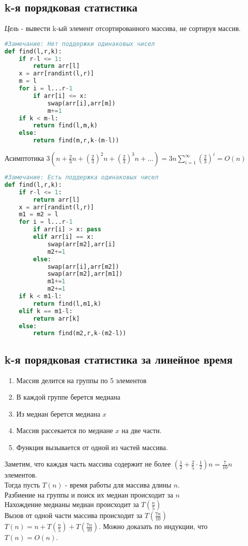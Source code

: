 \documentclass[12pt]{article}
\begin{document}
\subsection{k-я порядковая статистика}
\textit{Цель} - вывести k-ый элемент отсортированного массива, не сортируя массив.
\begin{lstlisting}[language=Python]
#Замечание: Нет поддержки одинаковых чисел
def find(l,r,k):
    if r-l <= 1:
        return arr[l]
    x = arr[randint(l,r)]
    m = l
    for i = l...r-1
        if arr[i] <= x:
            swap(arr[i],arr[m])
            m+=1
    if k < m-l:
        return find(l,m,k)
    else:
        return find(m,r,k-(m-l))
\end{lstlisting}
Асимптотика $3(n+\frac23n+(\frac23)^2n+(\frac23)^3n+\ldots) = 3n\sum\limits_{i=1}^\infty (\frac23)^i = O(n)$
\begin{lstlisting}[language=Python]
#Замечание: Есть поддержка одинаковых чисел
def find(l,r,k):
    if r-l <= 1:
        return arr[l]
    x = arr[randint(l,r)]
    m1 = m2 = l
    for i = l...r-1
        if arr[i] > x: pass
        elif arr[i] == x:
            swap(arr[m2],arr[i]
            m2+=1
        else:
            swap(arr[i],arr[m2])
            swap(arr[m2],arr[m1])
            m1+=1
            m2+=1
    if k < m1-l:
        return find(l,m1,k)
    elif k == m1-l:
        return arr[k]
    else:
        return find(m2,r,k-(m2-l))
\end{lstlisting}
\subsection{k-я порядковая статистика за линейное время}
\begin{enumerate}
    \item Массив делится на группы по 5 элементов
    \item В каждой группе берется медиана
    \item Из медиан берется медиана $x$
    \item Массив рассекается по медиане $x$ на две части.
    \item Функция вызывается от одной из частей массива.
\end{enumerate}
Заметим, что каждая часть массива содержит не более $(\frac12+\frac25\cdot\frac12)n=\frac7{10}n$ элементов.\\
Тогда пусть $T(n)$ - время работы для массива длины $n$.\\
Разбиение на группы и поиск их медиан происходит за $n$\\
Нахождение медианы медиан происходит за $T(\frac{n}5)$\\
Вызов от одной части массива происходит за $T(\frac{7n}{10})$\\
$T(n) = n+T(\frac{n}5)+T(\frac{7n}{10})$.
Можно доказать по индукции, что $T(n) = O(n)$.
\end{document}

